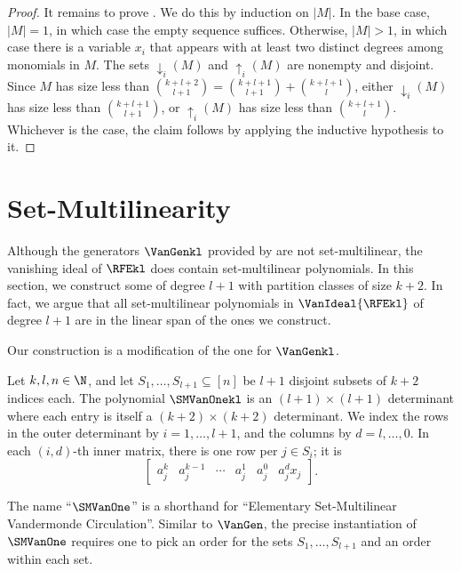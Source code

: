 \begin{proof}
  \medskip

  It remains to prove .
  We do this by induction on \(|{M}|\).
  In the base case, \(|{M}| = 1\), in which case the empty
  sequence suffices.
  Otherwise, \(|{M}| > 1\), in which case there is a variable
  \(x_i\) that appears with at least two distinct degrees among monomials in
  \({M}\).
  The sets \({\downarrow_i}({M})\) and \({\uparrow_i}({M})\) are
  nonempty and disjoint.
  Since \({M}\) has size less than
  \(\binom{k+l+2}{l+1} = \binom{k+l+1}{l+1} + \binom{k+l+1}{l}\),
  either \({\downarrow_i}({M})\) has size less than
  \(\binom{k+l+1}{l+1}\),
  or \({\uparrow_i}({M})\) has size less than \(\binom{k+l+1}{l}\).
  Whichever is the case, the claim follows by applying the inductive
  hypothesis to it.
\end{proof}



\section{Set-Multilinearity}
\label{s.set-multiaffine}

Although the generators $\VanGenkl$ provided by
 are not set-multilinear,
the vanishing ideal of $\RFEkl$ does contain set-multilinear polynomials.
In this section,
we construct some of degree $l+1$ with partition classes of size $k+2$.
In fact, we argue that all set-multilinear polynomials in $\VanIdeal{\RFEkl}$
of degree $l+1$ are in the linear span of the ones we construct.

Our construction is a modification of the one for $\VanGenkl$.
\begin{definition}
  \label{def.smvan1}
  Let \(k,l,n \in \N\),
  and let \(S_1,\ldots,S_{l+1}\subseteq [n]\) be \(l+1\) disjoint
  subsets of \(k+2\) indices each.
  The polynomial \(\SMVanOnekl\) is an \((l+1)\times(l+1)\) determinant
  where each entry is itself a \((k+2)\times(k+2)\) determinant.
  We index the rows in the outer determinant by \(i=1,\ldots,l+1\),
  and the columns by \(d=l,\ldots,0\).
  In each \((i,d)\)-th inner matrix, there is one row per \(j\in S_i\); it is
  \[
    \begin{bmatrix}
        a_j^k & a_j^{k-1} & \cdots & a_j^1 & a_j^0 & a_j^d x_j
    \end{bmatrix}.
  \]
\end{definition}
\noindent
The name ``\(\SMVanOne\)'' is a shorthand for ``Elementary Set-Multilinear
Vandermonde Circulation''.
Similar to \(\VanGen\), the precise instantiation of \(\SMVanOne\)
requires one to pick an order for the sets \(S_1,\ldots,S_{l+1}\) and an order within each set. 

